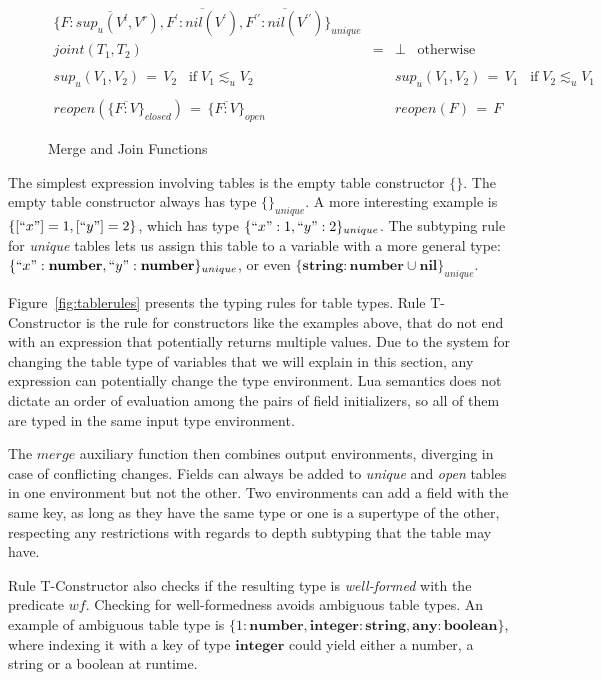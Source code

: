 \documentclass[10pt]{sigplanconf}
\newcommand{\Any}{\mathbf{any}}
\newcommand{\Nil}{\mathbf{nil}}
\newcommand{\Boolean}{\mathbf{boolean}}
\newcommand{\Integer}{\mathbf{integer}}
\newcommand{\Number}{\mathbf{number}}
\newcommand{\String}{\mathbf{string}}
\begin{document}
\begin{figure*}
{\[\begin{array}{rcl}
	\{\overline{F:sup_u(V^l,V^r)},\overline{F^\prime:nil(V^\prime)},\overline{F^{\prime\prime}:nil(V^{\prime\prime})}\}_{unique}\\
	joint(T_1, T_2) & = & \bot \;\;\; \mathrm{otherwise}\\\\
	sup_u(V_1, V_2) \,=\, V_2 \;\;\; \mathrm{if}\; V_1 \lesssim_u V_2 & &
	   sup_u(V_1, V_2) \,=\, V_1 \;\;\; \mathrm{if}\; V_2 \lesssim_u V_1 \\
	\\
	reopen(\{\overline{F:V}\}_{closed}) \,=\, \{\overline{F:V}\}_{open} & &
	  reopen(F) \,=\, F\end{array}
\]}
\caption{Merge and Join Functions}
\label{fig:mergejoin}
\end{figure*}

The simplest expression involving tables is the empty
table constructor $\{\}$. The empty table constructor always
has type $\{\}_{unique}$. A more interesting example is $\{ [``x"] = 1, [``y"] = 2 \}$, which has type $\{ ``x":1 , ``y": 2 \}_{unique}$. The subtyping rule for {\em unique} tables lets
us assign this table to a variable with a more general
type: $\{ ``x":\Number , ``y": \Number \}_{unique}$, or
even $\{ \String:\Number \cup \Nil \}_{unique}$. 

Figure~\ref{fig:tablerules} presents the typing rules for table types.
Rule {\sc T-Constructor} is the rule for constructors
like the examples above, that
do not end with an expression that potentially returns
multiple values.
Due to the system for changing the table type of variables that
we will explain in this section, any expression can potentially
change the type environment. Lua semantics does not dictate
an order of evaluation among the pairs of field initializers,
so all of them are typed in the same input type environment.

The $merge$ auxiliary function then combines output
environments, diverging in case of conflicting changes.
Fields can always be added to {\em unique} and {\em open}
tables in one environment but not the other. Two environments
can add a field with the same key, as long as they have
the same type or one is a supertype of the other, respecting
any restrictions with regards to depth subtyping that the table may have.  

Rule {\sc T-Constructor} also checks if the resulting type is {\em well-formed} with the predicate $wf$. Checking for well-formedness avoids ambiguous table types. An example of ambiguous table type is
$\{1:\Number, \Integer:\String, \Any:\Boolean\}$,
where indexing it with a key of type $\Integer$ could
yield either a number, a string or a boolean at runtime.
\end{document}
